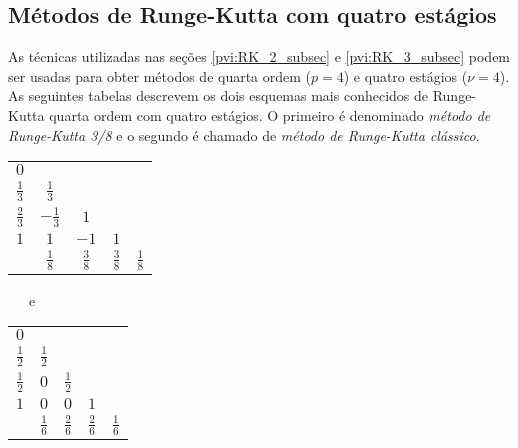 \subsection{Métodos de Runge-Kutta com quatro estágios}\label{pvi:RK_4_subsec}
As técnicas utilizadas nas seções \ref{pvi:RK_2_subsec}  e \ref{pvi:RK_3_subsec} podem ser usadas para obter métodos de quarta ordem ($p=4$) e quatro estágios ($\nu=4$). As seguintes tabelas descrevem os dois esquemas mais conhecidos de Runge-Kutta quarta ordem com quatro estágios. O primeiro é denominado \emph{método de Runge-Kutta 3/8} e o segundo é chamado de \emph{método de Runge-Kutta clássico}.

\begin{center}
\begin{tabular}{c|cccc}
  $0$ 		&     			&   		&   		&    \\
  $\frac{1}{3}$ & $\frac{1}{3}$ 	&   		&   		&    \\
  $\frac{2}{3}$ & $-\frac{1}{3}$ 	&$1$		&   		&    \\
  $1$ 		& $1$ 			&$-1$		&$1$		&    \\  \hline
		& $\frac{1}{8}$ 	&$\frac{3}{8}$	& $\frac{3}{8}$	& $\frac{1}{8}$
\end{tabular}
~~~\hbox{e}~~~~~~~
\begin{tabular}{c|cccc}
  $0$ 		&     			&   		&   		&    \\
  $\frac{1}{2}$ & $\frac{1}{2}$ 	&   		&   		&    \\
  $\frac{1}{2}$ & $0$ 			&$\frac{1}{2}$	&   		&    \\
  $1$ 		& $0$ 			&$0$		&$1$		&    \\  \hline
		& $\frac{1}{6}$ 	&$\frac{2}{6}$	& $\frac{2}{6}$	& $\frac{1}{6}$
\end{tabular}
\end{center}

